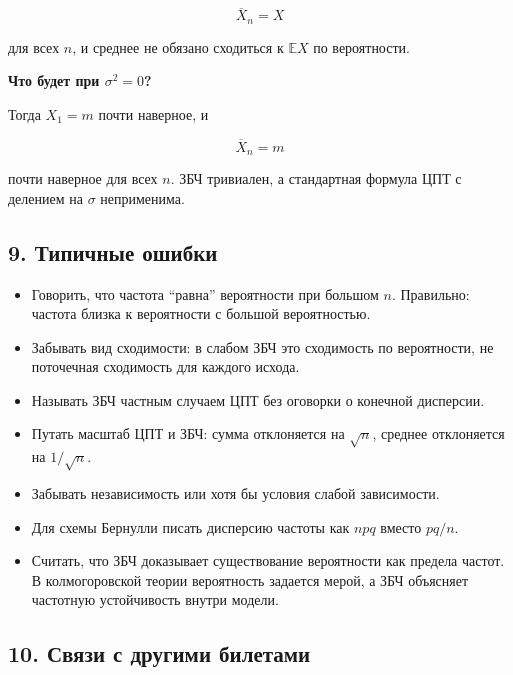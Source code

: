 \documentclass[
  11pt,
  a4paper,
]{article}
\providecommand{\tightlist}{%
  \setlength{\itemsep}{0pt}\setlength{\parskip}{0pt}}
\begin{document}
\[
\overline X_n=X
\]

для всех \(n\), и среднее не обязано сходиться к \(\mathbb EX\) по
вероятности.

\textbf{Что будет при \(\sigma^2=0\)?}

Тогда \(X_1=m\) почти наверное, и

\[
\overline X_n=m
\]

почти наверное для всех \(n\). ЗБЧ тривиален, а стандартная формула ЦПТ
с делением на \(\sigma\) неприменима.

\subsection{9. Типичные
ошибки}\label{ux442ux438ux43fux438ux447ux43dux44bux435-ux43eux448ux438ux431ux43aux438}

\begin{itemize}
\tightlist
\item
  Говорить, что частота ``равна'' вероятности при большом \(n\).
  Правильно: частота близка к вероятности с большой вероятностью.
\item
  Забывать вид сходимости: в слабом ЗБЧ это сходимость по вероятности,
  не поточечная сходимость для каждого исхода.
\item
  Называть ЗБЧ частным случаем ЦПТ без оговорки о конечной дисперсии.
\item
  Путать масштаб ЦПТ и ЗБЧ: сумма отклоняется на \(\sqrt n\), среднее
  отклоняется на \(1/\sqrt n\).
\item
  Забывать независимость или хотя бы условия слабой зависимости.
\item
  Для схемы Бернулли писать дисперсию частоты как \(npq\) вместо
  \(pq/n\).
\item
  Считать, что ЗБЧ доказывает существование вероятности как предела
  частот. В колмогоровской теории вероятность задается мерой, а ЗБЧ
  объясняет частотную устойчивость внутри модели.
\end{itemize}

\subsection{10. Связи с другими
билетами}\label{ux441ux432ux44fux437ux438-ux441-ux434ux440ux443ux433ux438ux43cux438-ux431ux438ux43bux435ux442ux430ux43cux438}
\end{document}
